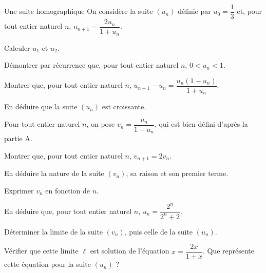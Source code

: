 \begin{exercice}[3]{Une suite homographique}
On considère la suite $(u_n)$ définie par $u_0=\dfrac{1}{3}$ et, pour tout entier naturel $n$,
$u_{n+1}=\dfrac{2u_n}{1+u_n}$.
\begin{questions}
  \item \begin{questions}
      \item Calculer $u_1$ et $u_2$.
      \item Démontrer par récurrence que, pour tout entier naturel $n$, $0<u_n<1$.
    \end{questions}
  \item \begin{questions}
      \item Montrer que, pour tout entier naturel $n$, $u_{n+1}-u_n=\dfrac{u_n(1-u_n)}{1+u_n}$.
      \item En déduire que la suite $(u_n)$ est croissante.
    \end{questions}
\end{questions}
Pour tout entier naturel $n$, on pose $v_n=\dfrac{u_n}{1-u_n}$, qui est bien défini d'après la partie A.
\begin{questions}[resume]
  \item \begin{questions}
      \item Montrer que, pour tout entier naturel $n$, $v_{n+1}=2v_n$.
      \item En déduire la nature de la suite $(v_n)$, sa raison et son premier terme.
    \end{questions}
  \item \begin{questions}
      \item Exprimer $v_n$ en fonction de $n$.
      \item En déduire que, pour tout entier naturel $n$, $u_n=\dfrac{2^{n}}{2^{n}+2}$.
    \end{questions}
\end{questions}
\begin{questions}[resume]
  \item Déterminer la limite de la suite $(v_n)$, puis celle de la suite $(u_n)$.
  \item Vérifier que cette limite $\ell$ est solution de l'équation $x=\dfrac{2x}{1+x}$. Que représente cette équation pour la suite $(u_n)$ ?
\end{questions}
\end{exercice}

